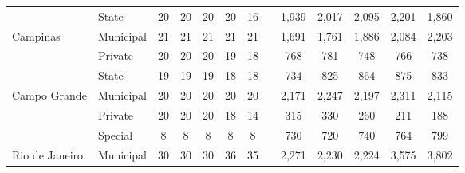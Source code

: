 \documentclass[a4paper, 12pt]{article}
\begin{document}
\begin{table}[H]
\begin{adjustbox}{width=1\textwidth}
\begin{tabular}{llllllllllllr}
\cmidrule{1-7}\cmidrule{9-13}          & State & \multicolumn{1}{c}{20 } & \multicolumn{1}{c}{20 } & \multicolumn{1}{c}{20 } & \multicolumn{1}{c}{20 } & \multicolumn{1}{c}{16 } &       & \multicolumn{1}{c}{1,939 } & \multicolumn{1}{c}{2,017} & \multicolumn{1}{c}{2,095 } & \multicolumn{1}{c}{2,201 } & \multicolumn{1}{c}{1,860 } \\
    Campinas & Municipal & \multicolumn{1}{c}{21 } & \multicolumn{1}{c}{21 } & \multicolumn{1}{c}{21 } & \multicolumn{1}{c}{21 } & \multicolumn{1}{c}{21 } &       & \multicolumn{1}{c}{1,691 } & \multicolumn{1}{c}{1,761} & \multicolumn{1}{c}{1,886 } & \multicolumn{1}{c}{2,084 } & \multicolumn{1}{c}{2,203 } \\
          & Private & \multicolumn{1}{c}{20 } & \multicolumn{1}{c}{20 } & \multicolumn{1}{c}{20 } & \multicolumn{1}{c}{19 } & \multicolumn{1}{c}{18 } &       & \multicolumn{1}{c}{768 } & \multicolumn{1}{c}{781} & \multicolumn{1}{c}{748 } & \multicolumn{1}{c}{766 } & \multicolumn{1}{c}{738 } \\
\cmidrule{1-7}\cmidrule{9-13}          & State & \multicolumn{1}{c}{19 } & \multicolumn{1}{c}{19 } & \multicolumn{1}{c}{19 } & \multicolumn{1}{c}{18 } & \multicolumn{1}{c}{18 } &       & \multicolumn{1}{c}{734 } & \multicolumn{1}{c}{825} & \multicolumn{1}{c}{864 } & \multicolumn{1}{c}{875 } & \multicolumn{1}{c}{833 } \\
    Campo Grande & Municipal & \multicolumn{1}{c}{20 } & \multicolumn{1}{c}{20 } & \multicolumn{1}{c}{20 } & \multicolumn{1}{c}{20 } & \multicolumn{1}{c}{20 } &       & \multicolumn{1}{c}{2,171 } & \multicolumn{1}{c}{2,247} & \multicolumn{1}{c}{2,197 } & \multicolumn{1}{c}{2,311 } & \multicolumn{1}{c}{2,115 } \\
          & Private & \multicolumn{1}{c}{20 } & \multicolumn{1}{c}{20 } & \multicolumn{1}{c}{20 } & \multicolumn{1}{c}{18 } & \multicolumn{1}{c}{14 } &       & \multicolumn{1}{c}{315 } & \multicolumn{1}{c}{330} & \multicolumn{1}{c}{260 } & \multicolumn{1}{c}{211 } & \multicolumn{1}{c}{188 } \\
\cmidrule{1-7}\cmidrule{9-13}          & Special & \multicolumn{1}{c}{8 } & \multicolumn{1}{c}{8 } & \multicolumn{1}{c}{8 } & \multicolumn{1}{c}{8 } & \multicolumn{1}{c}{8 } &       & \multicolumn{1}{c}{730 } & \multicolumn{1}{c}{720} & \multicolumn{1}{c}{740 } & \multicolumn{1}{c}{764 } & \multicolumn{1}{c}{799 } \\
    Rio de Janeiro & Municipal & \multicolumn{1}{c}{30 } & \multicolumn{1}{c}{30 } & \multicolumn{1}{c}{30 } & \multicolumn{1}{c}{36 } & \multicolumn{1}{c}{35 } &       & \multicolumn{1}{c}{2,271 } & \multicolumn{1}{c}{2,230} & \multicolumn{1}{c}{2,224 } & \multicolumn{1}{c}{3,575 } & \multicolumn{1}{c}{3,802 } \\

\end{tabular}
\end{adjustbox}
\end{table}
\end{document}
